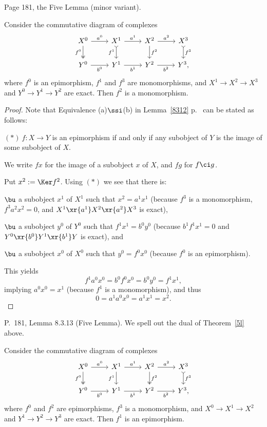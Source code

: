 \documentclass[12pt]{article}
\theoremstyle{remark}
\theoremstyle{definition}
\begin{document}
\begin{s} 
Page 181, the Five Lemma (minor variant). 

\begin{thm} 
Consider the commutative diagram of complexes 
$$
\begin{tikzcd}
X^0\arrow[two heads]{d}[swap]{f^0}\arrow{r}{a^0}&
X^1\arrow[tail]{d}[swap]{f^1}\arrow{r}{a^1}&
X^2\arrow{d}{f^2}\arrow{r}{a^2}&
X^3\arrow[tail]{d}{f^3}\\ 
Y^0\arrow{r}[swap]{b^0}&
Y^1\arrow{r}[swap]{b^1}&
Y^2\arrow{r}[swap]{b^2}&
Y^3,
\end{tikzcd}
$$
where $f^0$ is an epimorphism, $f^1$ and $f^3$ are monomorphisms, and $X^1\to X^2\to X^3$ and $Y^0\to Y^1\to Y^2$ are exact. Then $f^2$ is a monomorphism. 
\end{thm} 

\begin{proof}
Note that Equivalence (a)$\ssi$(b) in Lemma~\ref{8312} p.~ can be stated as follows: 

\nn$(*)\ f:X\to Y$ is an epimorphism if and only if any subobject of $Y$ is the image of some subobject of $X$. 

We write $fx$ for the image of a subobject $x$ of $X$, and $fg$ for $f\ci g$.

Put $x^2:=\Ker f^2$. Using $(*)$ we see that there is: 

\nn$\bu$ a subobject $x^1$ of $X^1$ such that $x^2=a^1x^1$ (because $f^3$ is a monomorphism, $f^3a^2x^2=0$, and $X^1\xr{a^1}X^2\xr{a^2}X^3$ is exact), 

\nn$\bu$ a subobject $y^0$ of $Y^0$ such that $f^1x^1=b^0y^0$ (because $b^1f^1x^1=0$ and $Y^0\xr{b^0}Y^1\xr{b^1}Y$ is exact), and 

\nn$\bu$ a subobject $x^0$ of $X^0$ such that $y^0=f^0x^0$ (because $f^0$ is an epimorphism). 

This yields 
$$
f^1a^0x^0=b^0f^0x^0=b^0y^0=f^1x^1,
$$
implying $a^0x^0=x^1$ (because $f^1$ is a monomorphism), and thus 
$$
0=a^1a^0x^0=a^1x^1=x^2.
$$ 
\end{proof}
\end{s}

%

\begin{s} 
P.~181, Lemma 8.3.13 (Five Lemma). We spell out the dual of Theorem~\ref{5l} above.
\begin{thm} 
Consider the commutative diagram of complexes 
$$
\begin{tikzcd}
X^0\arrow[two heads]{d}[swap]{f^0}\arrow{r}{a^0}&
X^1\arrow{d}[swap]{f^1}\arrow{r}{a^1}&
X^2\arrow[two heads]{d}{f^2}\arrow{r}{a^2}&
X^3\arrow[tail]{d}{f^3}\\ 
Y^0\arrow{r}[swap]{b^0}&
Y^1\arrow{r}[swap]{b^1}&
Y^2\arrow{r}[swap]{b^2}&
Y^3,
\end{tikzcd}
$$
where $f^0$ and $f^2$ are epimorphisms, $f^3$ is a monomorphism, and $X^0\to X^1\to X^2$ and $Y^1\to Y^2\to Y^3$ are exact. Then $f^1$ is an epimorphism. 
\end{thm}
\end{s}
\end{document}
